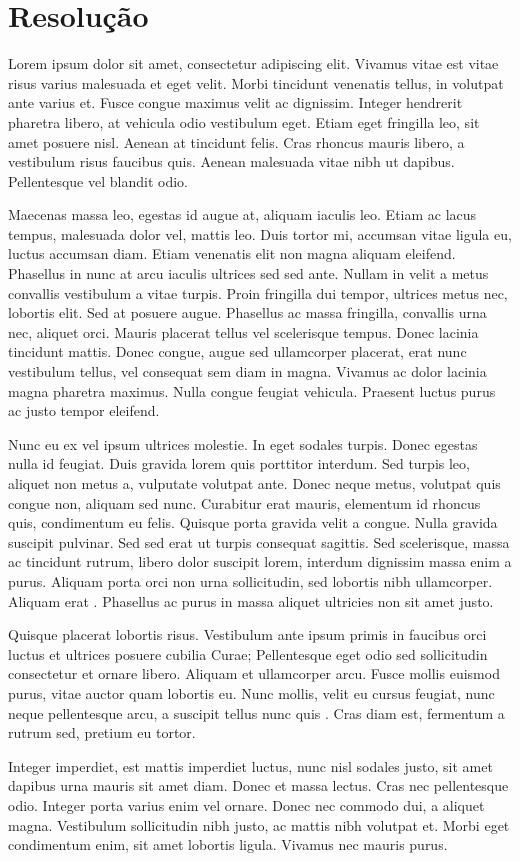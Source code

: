 \chapter{Resolução}

Lorem ipsum dolor sit amet, consectetur adipiscing elit. Vivamus vitae est vitae risus varius malesuada et eget velit. Morbi tincidunt venenatis tellus, in volutpat ante varius et. Fusce congue maximus velit ac dignissim. Integer hendrerit pharetra libero, at vehicula odio vestibulum eget. Etiam eget fringilla leo, sit amet posuere nisl. Aenean at tincidunt felis. Cras rhoncus mauris libero, a vestibulum risus faucibus quis. Aenean malesuada vitae nibh ut dapibus. Pellentesque vel blandit odio.

Maecenas massa leo, egestas id augue at, aliquam iaculis leo. Etiam ac lacus tempus, malesuada dolor vel, mattis leo. Duis tortor mi, accumsan vitae ligula eu, luctus accumsan diam. Etiam venenatis elit non magna aliquam eleifend. Phasellus in nunc at arcu iaculis ultrices sed sed ante. Nullam in velit a metus convallis vestibulum a vitae turpis. Proin fringilla dui tempor, ultrices metus nec, lobortis elit. Sed at posuere augue. Phasellus ac massa fringilla, convallis urna nec, aliquet orci. Mauris placerat tellus vel scelerisque tempus. Donec lacinia tincidunt mattis. Donec congue, augue sed ullamcorper placerat, erat nunc vestibulum tellus, vel consequat sem diam in magna. Vivamus ac dolor lacinia magna pharetra maximus. Nulla congue feugiat vehicula. Praesent luctus purus ac justo tempor eleifend.

Nunc eu ex vel ipsum ultrices molestie. In eget sodales turpis. Donec egestas  nulla id feugiat. Duis gravida lorem quis porttitor interdum. Sed turpis leo, aliquet non metus a, vulputate volutpat ante. Donec neque metus, volutpat quis congue non, aliquam sed nunc. Curabitur erat mauris, elementum id rhoncus quis, condimentum eu felis. Quisque porta gravida velit a congue. Nulla gravida suscipit pulvinar. Sed sed erat ut turpis consequat sagittis. Sed scelerisque, massa ac tincidunt rutrum, libero dolor suscipit lorem, interdum dignissim massa enim a purus. Aliquam porta orci non urna sollicitudin, sed lobortis nibh ullamcorper. Aliquam erat . Phasellus ac purus in massa aliquet ultricies non sit amet justo.

Quisque placerat lobortis risus. Vestibulum ante ipsum primis in faucibus orci luctus et ultrices posuere cubilia Curae; Pellentesque eget odio sed  sollicitudin consectetur et ornare libero. Aliquam et ullamcorper arcu. Fusce mollis euismod purus, vitae auctor quam lobortis eu. Nunc mollis, velit eu cursus feugiat, nunc neque pellentesque arcu, a suscipit tellus nunc quis . Cras diam est, fermentum a rutrum sed, pretium eu tortor.

Integer imperdiet, est mattis imperdiet luctus, nunc nisl sodales justo, sit amet dapibus urna mauris sit amet diam. Donec et massa lectus. Cras nec pellentesque odio. Integer porta varius enim vel ornare. Donec nec commodo dui, a aliquet magna. Vestibulum sollicitudin nibh justo, ac mattis nibh volutpat et. Morbi eget condimentum enim, sit amet lobortis ligula. Vivamus nec mauris purus.